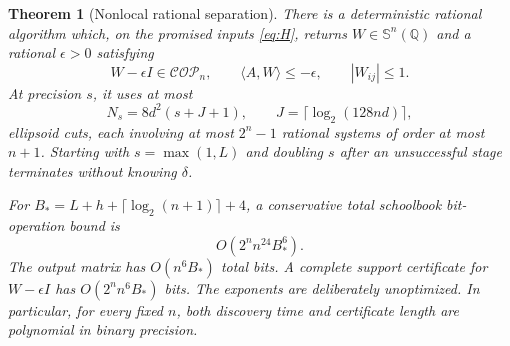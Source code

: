 \documentclass[11pt]{article}
\newtheorem{theorem}{Theorem}[section]
\theoremstyle{remark}\newtheorem{remark}[theorem]{Remark}
\newcommand{\COP}{\mathcal{COP}}
\newcommand{\ip}[2]{\langle #1,#2\rangle}
\begin{document}
\begin{theorem}[Nonlocal rational separation]\label{thm:nonlocal}
There is a deterministic rational algorithm which, on the promised inputs \eqref{eq:H}, returns $W\in\mathbb S^n(\mathbb Q)$ and a rational $\epsilon>0$ satisfying
\[
 W-\epsilon I\in\COP_n,\qquad \ip AW\le-\epsilon,
 \qquad |W_{ij}|\le1.
\]
At precision $s$, it uses at most
\begin{equation}\label{eq:stage}
 N_s=8d^2(s+J+1),\qquad J=\lceil\log_2(128nd)\rceil,
\end{equation}
ellipsoid cuts, each involving at most $2^n-1$ rational systems of order at most $n+1$. Starting with $s=\max(1,L)$ and doubling $s$ after an unsuccessful stage terminates without knowing $\delta$.

For $B_*=L+h+\lceil\log_2(n+1)\rceil+4$, a conservative total schoolbook bit-operation bound is
\[
 O(2^n n^{24}B_*^6).
\]
The output matrix has $O(n^6B_*)$ total bits. A complete support certificate for $W-\epsilon I$ has $O(2^n n^6B_*)$ bits. The exponents are deliberately unoptimized. In particular, for every fixed $n$, both discovery time and certificate length are polynomial in binary precision.
\end{theorem}
\end{document}
